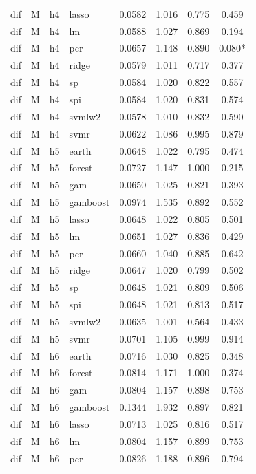 \begin{ThreePartTable}
\begin{longtable}[t]{llclcccc}
dif & M & h4 & lasso & 0.0582 & 1.016 & 0.775 & 0.459\\
dif & M & h4 & lm & 0.0588 & 1.027 & 0.869 & 0.194\\
dif & M & h4 & pcr & 0.0657 & 1.148 & 0.890 & 0.080*\\
dif & M & h4 & ridge & 0.0579 & 1.011 & 0.717 & 0.377\\
dif & M & h4 & sp & 0.0584 & 1.020 & 0.822 & 0.557\\
dif & M & h4 & spi & 0.0584 & 1.020 & 0.831 & 0.574\\
dif & M & h4 & svmlw2 & 0.0578 & 1.010 & 0.832 & 0.590\\
dif & M & h4 & svmr & 0.0622 & 1.086 & 0.995 & 0.879\\
\addlinespace
dif & M & h5 & earth & 0.0648 & 1.022 & 0.795 & 0.474\\
dif & M & h5 & forest & 0.0727 & 1.147 & 1.000 & 0.215\\
dif & M & h5 & gam & 0.0650 & 1.025 & 0.821 & 0.393\\
dif & M & h5 & gamboost & 0.0974 & 1.535 & 0.892 & 0.552\\
dif & M & h5 & lasso & 0.0648 & 1.022 & 0.805 & 0.501\\
dif & M & h5 & lm & 0.0651 & 1.027 & 0.836 & 0.429\\
dif & M & h5 & pcr & 0.0660 & 1.040 & 0.885 & 0.642\\
dif & M & h5 & ridge & 0.0647 & 1.020 & 0.799 & 0.502\\
dif & M & h5 & sp & 0.0648 & 1.021 & 0.809 & 0.506\\
dif & M & h5 & spi & 0.0648 & 1.021 & 0.813 & 0.517\\
dif & M & h5 & svmlw2 & 0.0635 & 1.001 & 0.564 & 0.433\\
dif & M & h5 & svmr & 0.0701 & 1.105 & 0.999 & 0.914\\
\addlinespace
dif & M & h6 & earth & 0.0716 & 1.030 & 0.825 & 0.348\\
dif & M & h6 & forest & 0.0814 & 1.171 & 1.000 & 0.374\\
dif & M & h6 & gam & 0.0804 & 1.157 & 0.898 & 0.753\\
dif & M & h6 & gamboost & 0.1344 & 1.932 & 0.897 & 0.821\\
dif & M & h6 & lasso & 0.0713 & 1.025 & 0.816 & 0.517\\
dif & M & h6 & lm & 0.0804 & 1.157 & 0.899 & 0.753\\
dif & M & h6 & pcr & 0.0826 & 1.188 & 0.896 & 0.794\\

\end{longtable}
\end{ThreePartTable}
